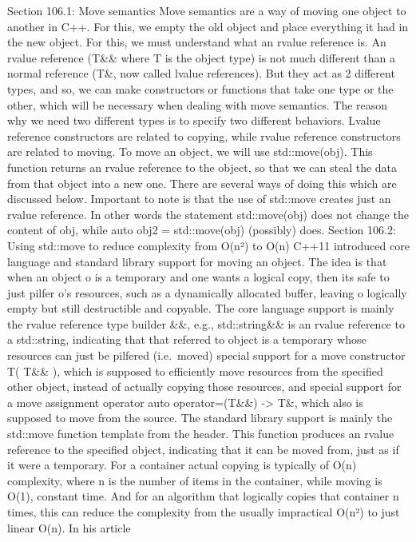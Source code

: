 Section 106.1: Move semantics Move semantics are a way of moving one
object to another in C++. For this, we empty the old object and place
everything it had in the new object. For this, we must understand what
an rvalue reference is. An rvalue reference (T\&\& where T is the object
type) is not much diﬀerent than a normal reference (T\&, now called
lvalue references). But they act as 2 diﬀerent types, and so, we can
make constructors or functions that take one type or the other, which
will be necessary when dealing with move semantics. The reason why we
need two diﬀerent types is to specify two diﬀerent behaviors. Lvalue
reference constructors are related to copying, while rvalue reference
constructors are related to moving. To move an object, we will use
std::move(obj). This function returns an rvalue reference to the object,
so that we can steal the data from that object into a new one. There are
several ways of doing this which are discussed below. Important to note
is that the use of std::move creates just an rvalue reference. In other
words the statement std::move(obj) does not change the content of obj,
while auto obj2 = std::move(obj) (possibly) does. Section 106.2: Using
std::move to reduce complexity from O(n²) to O(n) C++11 introduced core
language and standard library support for moving an object. The idea is
that when an object o is a temporary and one wants a logical copy, then
its safe to just pilfer o's resources, such as a dynamically allocated
buﬀer, leaving o logically empty but still destructible and copyable.
The core language support is mainly the rvalue reference type builder
\&\&, e.g., std::string\&\& is an rvalue reference to a std::string,
indicating that that referred to object is a temporary whose resources
can just be pilfered (i.e.~moved) special support for a move constructor
T( T\&\& ), which is supposed to eﬃciently move resources from the
speciﬁed other object, instead of actually copying those resources, and
special support for a move assignment operator auto operator=(T\&\&)
-\textgreater{} T\&, which also is supposed to move from the source. The
standard library support is mainly the std::move function template from
the header. This function produces an rvalue reference to the speciﬁed
object, indicating that it can be moved from, just as if it were a
temporary. For a container actual copying is typically of O(n)
complexity, where n is the number of items in the container, while
moving is O(1), constant time. And for an algorithm that logically
copies that container n times, this can reduce the complexity from the
usually impractical O(n²) to just linear O(n). In his article
